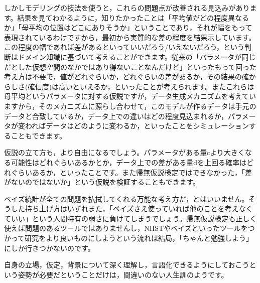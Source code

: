 \documentclass{ltjsbook}
\begin{document}
しかしモデリングの技法を使うと，これらの問題点が改善される見込みがあります。結果を見てわかるように，知りたかったことは「平均値がどの程度異なるか」「母平均の位置はどこにありそうか」ということであり，それが幅をもって表現されているわけですから，最初から実質的な差の程度を結果示しています。この程度の幅であれば差があるといっていいだろう/いえないだろう，という判断はドメイン知識に基づいて考えることができます。従来の「パラメータが同じだとした仮想空間のなかではあり得ないことなんだけど」といったもって回った考え方は不要で，値がどれぐらいか，どれぐらいの差があるか，その結果の確からしさ(確信度)は高いといえるか，といったことが考えられます。またこれらは母平均というパラメータに対する仮説ですが，データ生成メカニズムを考えていますから，そのメカニズムに照らし合わせて，このモデルが作るデータは手元のデータと合致しているか，データ上での違いはどの程度見込まれるか，パラメータが変わればデータはどのように変わるか，といったことをシミュレーションすることもできます。

仮説の立て方も，より自由になるでしょう。パラメータがある量cより大きくなる可能性はどれぐらいあるかとか，データ上での差がある量dを上回る確率はどれぐらいあるか，といったことです。また帰無仮説検定ではできなかった，「差がないのではないか」という仮説を検証することもできます。

ベイズ統計が全ての問題を払拭してくれる万能な考え方だ，とはいいません。そうした持ち上げ方はいずれまた，「ベイズさえ使っていれば他のことを考えなくていい」という人間特有の弱さに負けてしまうでしょう。帰無仮説検定も正しく使えば問題のあるツールではありませんし，NHSTやベイズといったツールをつかって研究をより良いものにしようという流れは結局，「ちゃんと勉強しよう」にしか行きつかないのです。

自身の立場，仮定，背景について深く理解し，言語化できるようにしておこうという姿勢が必要だということだけは，間違いのない人生訓のようです。
\end{document}
